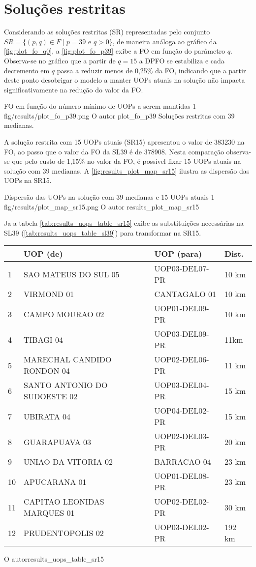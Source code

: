 \section{Soluções restritas}

Considerando as soluções restritas (SR) representadas pelo conjunto $SR = \{ (p,q) \in F \mid p = 39 \text{ e } q > 0 \}$, de maneira análoga ao gráfico da \autoref{fig:plot_fo_q0}, a \autoref{fig:plot_fo_p39} exibe a FO em função do parâmetro $q$. Observa-se no gráfico que a partir de $q = 15$ a DPFO se estabiliza e cada decremento em $q$ passa a reduzir menos de 0,25\% da FO, indicando que a partir deste ponto desobrigar o modelo a manter UOPs atuais na solução não impacta significativamente na redução do valor da FO.

\figurah
{FO em função do número mínimo de UOPs a serem mantidas}
{1}
{fig/results/plot_fo_p39.png}
{O autor}
{plot_fo_p39}
{Soluções restritas com 39 medianas.}
{}

A solução restrita com 15 UOPs atuais (SR15) apresentou o valor de 383230 na FO, ao passo que o valor da FO da SL39 é de 378908. Nesta comparação observa-se que pelo custo de 1,15\% no valor da FO, é possível fixar 15 UOPs atuais na solução com 39 medianas. A \autoref{fig:results_plot_map_sr15} ilustra as dispersão das UOPs na SR15.

\figurah
{Dispersão das UOPs na solução com 39 medianas e 15 UOPs atuais}
{1}
{fig/results/plot_map_sr15.png}
{O autor}
{results_plot_map_sr15}
{}
{}

Ja a tabela \autoref{tab:results_uops_table_sr15} exibe as substituições necessárias na SL39 (\autoref{tab:results_uops_table_sl39}) para transformar na SR15.

{\begin{tabular}{l|l|l|l}\hline
   & UOP (de)  & UOP (para)  &  Dist. \\ \hline\hline
 1 &         SAO MATEUS DO SUL 05 & UOP03-DEL07-PR &  10 km \\
 2 &                   VIRMOND 01 &   CANTAGALO 01 &  10 km \\
 3 &              CAMPO MOURAO 02 & UOP01-DEL09-PR &  10  km \\
 4 &                    TIBAGI 04 & UOP03-DEL09-PR &  11km \\
 5 &   MARECHAL CANDIDO RONDON 04 & UOP02-DEL06-PR &  11 km \\
 6 & SANTO ANTONIO DO SUDOESTE 02 & UOP03-DEL04-PR &  15 km \\
 7 &                   UBIRATA 04 & UOP04-DEL02-PR &  15 km \\
 8 &                GUARAPUAVA 03 & UOP02-DEL03-PR &  20 km \\
 9 &          UNIAO DA VITORIA 02 &    BARRACAO 04 &  23 km \\
10 &                 APUCARANA 01 & UOP01-DEL08-PR &  23 km \\
11 &  CAPITAO LEONIDAS MARQUES 01 & UOP02-DEL02-PR &  30 km \\
12 &             PRUDENTOPOLIS 02 & UOP03-DEL02-PR & 192 km  \\
 \hline
\end{tabular}}
{O autor}{results_uops_table_sr15}{}{}

